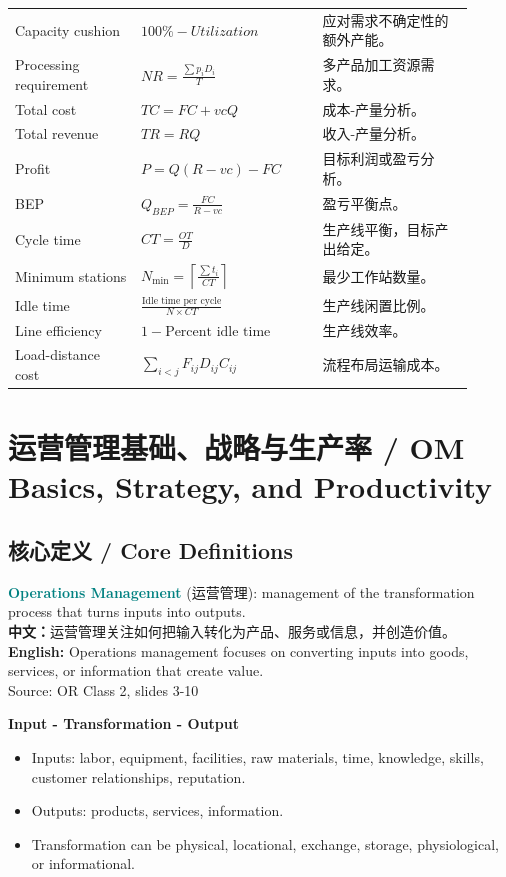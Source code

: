 \documentclass[10pt,a4paper]{ctexart}
\newcommand{\term}[2]{\textbf{\textcolor{Teal}{#1}} \textcolor{Muted}{(#2)}}
\newcommand{\source}[1]{\textcolor{Muted}{\footnotesize Source: #1}}
\newcommand{\cn}[1]{\textbf{中文：}#1}
\newcommand{\en}[1]{\textbf{English:} #1}
\begin{document}
\begin{longtable}{@{}L{0.25\linewidth}L{0.36\linewidth}L{0.30\linewidth}@{}}
Capacity cushion & $100\%-Utilization$ & 应对需求不确定性的额外产能。 \\
Processing requirement & $NR=\frac{\sum p_iD_i}{T}$ & 多产品加工资源需求。 \\
Total cost & $TC=FC+vcQ$ & 成本-产量分析。 \\
Total revenue & $TR=RQ$ & 收入-产量分析。 \\
Profit & $P=Q(R-vc)-FC$ & 目标利润或盈亏分析。 \\
BEP & $Q_{BEP}=\frac{FC}{R-vc}$ & 盈亏平衡点。 \\
Cycle time & $CT=\frac{OT}{D}$ & 生产线平衡，目标产出给定。 \\
Minimum stations & $N_{\min}=\left\lceil \frac{\sum t_i}{CT}\right\rceil$ & 最少工作站数量。 \\
Idle time & $\frac{\text{Idle time per cycle}}{N\times CT}$ & 生产线闲置比例。 \\
Line efficiency & $1-\text{Percent idle time}$ & 生产线效率。 \\
Load-distance cost & $\sum_{i<j}F_{ij}D_{ij}C_{ij}$ & 流程布局运输成本。 \\
\bottomrule
\end{longtable}

\section{运营管理基础、战略与生产率 / OM Basics, Strategy, and Productivity}
\label{sec:om}

\subsection{核心定义 / Core Definitions}

\term{Operations Management}{运营管理}: management of the transformation process that turns inputs into outputs. \\
\cn{运营管理关注如何把输入转化为产品、服务或信息，并创造价值。}\\
\en{Operations management focuses on converting inputs into goods, services, or information that create value.}\\
\source{OR Class 2, slides 3-10}

\textbf{Input - Transformation - Output}
\begin{itemize}
  \item Inputs: labor, equipment, facilities, raw materials, time, knowledge, skills, customer relationships, reputation.
  \item Outputs: products, services, information.
  \item Transformation can be physical, locational, exchange, storage, physiological, or informational.
\end{itemize}
\end{document}
